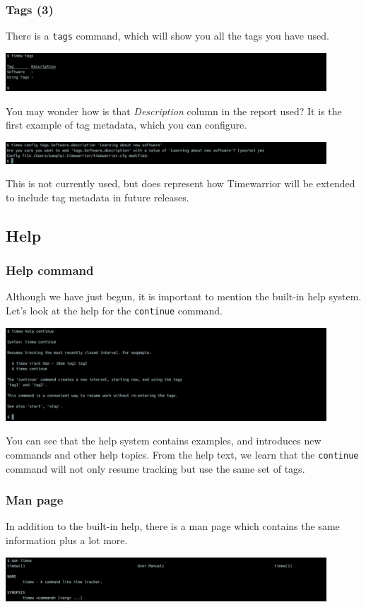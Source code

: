 \documentclass[t,handout]{beamer}
\begin{document}
\begin{frame}[fragile]\frametitle{Tags (3)}
    There is a \verb=tags= command, which will show you all the tags you have used.

    \includegraphics[width=12cm]{images/tutorial11.png}

    You may wonder how is that \textit{Description} column in the report used? It is the first example of tag metadata, which you can configure.

    \includegraphics[width=12cm]{images/tutorial12.png}

    This is not currently used, but does represent how Timewarrior will be extended to include tag metadata in future releases.
\end{frame}

\subsection{Help}

\begin{frame}[fragile]\frametitle{Help command}
    Although we have just begun, it is important to mention the built-in help system. Let's look at the help for the \verb=continue= command.

    \includegraphics[width=12cm]{images/tutorial13.png}

    You can see that the help system contains examples, and introduces new commands and other help topics. From the help text, we learn that the \verb=continue= command will not only resume tracking but use the same set of tags.
\end{frame}

\begin{frame}[fragile]\frametitle{Man page}
    In addition to the built-in help, there is a man page which contains the same information plus a lot more.

    \includegraphics[width=12cm]{images/tutorial14.png}
\end{frame}
\end{document}
